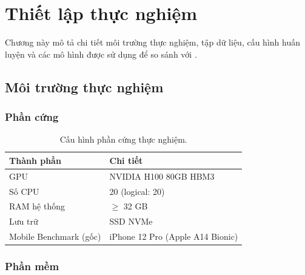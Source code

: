 \chapter{Thiết lập thực nghiệm}
\label{chap:experiment_setup}

Chương này mô tả chi tiết môi trường thực nghiệm, tập dữ liệu, cấu hình huấn luyện và các mô hình được sử dụng để so sánh với \fastvit{}.

\section{Môi trường thực nghiệm}
\label{sec:environment}

\subsection{Phần cứng}
\label{subsec:hardware}

\begin{table}[H]
\centering
\caption{Cấu hình phần cứng thực nghiệm.}
\label{tab:hardware}
\begin{tabular}{l l}
\toprule
\textbf{Thành phần} & \textbf{Chi tiết} \\
\midrule
GPU & NVIDIA H100 80GB HBM3 \\
Số CPU & 20 (logical: 20) \\
RAM hệ thống & $\geq$ 32 GB \\
Lưu trữ & SSD NVMe \\
Mobile Benchmark (gốc) & iPhone 12 Pro (Apple A14 Bionic) \\
\bottomrule
\end{tabular}
\end{table}

\subsection{Phần mềm}
\label{subsec:software}

